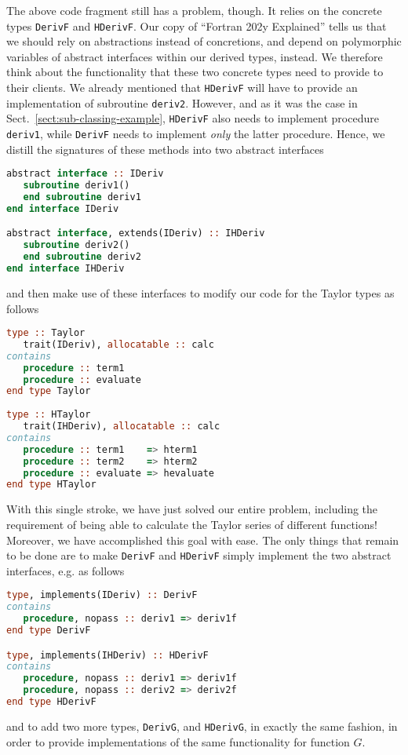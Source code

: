 \documentclass[11pt,oneside]{article}
\begin{document}
The above code fragment still has a problem, though. It relies on the
concrete types \texttt{DerivF} and \texttt{HDerivF}. Our copy of
``Fortran 202y Explained'' tells us that we should rely on
abstractions instead of concretions, and depend on polymorphic
variables of abstract interfaces within our derived types, instead. We
therefore think about the functionality that these two concrete types
need to provide to their clients. We already mentioned that
\texttt{HDerivF} will have to provide an implementation of subroutine
\texttt{deriv2}. However, and as it was the case in
Sect.~\ref{sect:sub-classing-example}, \texttt{HDerivF} also needs to
implement procedure \texttt{deriv1}, while \texttt{DerivF} needs to
implement \emph{only} the latter procedure. Hence, we distill the
signatures of these methods into two abstract interfaces
\begin{lstlisting}[language=Fortran]
abstract interface :: IDeriv
   subroutine deriv1()
   end subroutine deriv1
end interface IDeriv

abstract interface, extends(IDeriv) :: IHDeriv
   subroutine deriv2()
   end subroutine deriv2
end interface IHDeriv
\end{lstlisting}
and then make use of these interfaces to modify our code for the
Taylor types as follows
\begin{lstlisting}[language=Fortran]
type :: Taylor
   trait(IDeriv), allocatable :: calc
contains
   procedure :: term1
   procedure :: evaluate
end type Taylor
   
type :: HTaylor
   trait(IHDeriv), allocatable :: calc
contains
   procedure :: term1    => hterm1
   procedure :: term2    => hterm2
   procedure :: evaluate => hevaluate
end type HTaylor
\end{lstlisting}
With this single stroke, we have just solved our entire problem,
including the requirement of being able to calculate the Taylor series
of different functions! Moreover, we have accomplished this goal with
ease. The only things that remain to be done are to make
\texttt{DerivF} and \texttt{HDerivF} simply implement the two abstract
interfaces, e.g. as follows
\begin{lstlisting}[language=Fortran,
    caption={Implementation of interfaces for derivatives of function $F$.},
    label={listing:implderivf}]
type, implements(IDeriv) :: DerivF
contains
   procedure, nopass :: deriv1 => deriv1f
end type DerivF

type, implements(IHDeriv) :: HDerivF
contains
   procedure, nopass :: deriv1 => deriv1f
   procedure, nopass :: deriv2 => deriv2f
end type HDerivF
\end{lstlisting}
and to add two more types, \texttt{DerivG}, and \texttt{HDerivG}, in
exactly the same fashion, in order to provide implementations of the
same functionality for function $G$.
\end{document}
